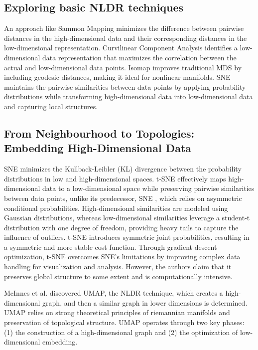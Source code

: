 \subsection{Exploring basic NLDR techniques}
An approach like Sammon Mapping \cite{henderson1997sammon} minimizes the difference between pairwise distances in the high-dimensional data and their corresponding distances in the low-dimensional representation. Curvilinear Component Analysis \cite{demartines1995cca} identifies a low-dimensional data representation that maximizes the correlation between the actual and low-dimensional data points. Isomap \cite{tenenbaum2000global} improves traditional MDS \cite{hout2013multidimensional} by including geodesic distances, making it ideal for nonlinear manifolds. SNE \cite{hinton2002stochastic} maintains the pairwise similarities between data points by applying probability distributions while transforming high-dimensional data into low-dimensional data and capturing local structures.

\subsection{From Neighbourhood to Topologies: Embedding High-Dimensional Data}

SNE \cite{hinton2002stochastic} minimizes the Kullback-Leibler (KL) divergence between the probability distributions in low and high-dimensional spaces. t-SNE \cite{tsne} effectively maps high-dimensional data to a low-dimensional space while preserving pairwise similarities between data points, unlike its predecessor, SNE \cite{hinton2002stochastic}, which relies on asymmetric conditional probabilities. High-dimensional similarities are modeled using Gaussian distributions, whereas low-dimensional similarities leverage a student-t distribution with one degree of freedom, providing heavy tails to capture the influence of outliers. t-SNE \cite{tsne} introduces symmetric joint probabilities, resulting in a symmetric and more stable cost function. Through gradient descent optimization, t-SNE \cite{tsne} overcomes SNE’s limitations by improving complex data handling for visualization and analysis. However, the authors claim that it preserves global structure to some extent and is computationally intensive.


McInnes et al. \cite{umap_reference} discovered UMAP, the NLDR technique, which creates a high-dimensional graph, and then a similar graph in lower dimensions is determined. UMAP relies on strong theoretical principles of riemannian manifolds \cite{lin2008riemannian} and preservation of topological structure. UMAP operates through two key phases: (1) the construction of a high-dimensional graph and (2) the optimization of low-dimensional embedding. 


